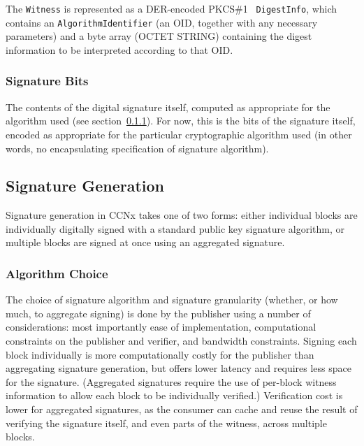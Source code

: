 The {\tt Witness} is represented as a DER-encoded PKCS\#1 {\tt
  DigestInfo}, which contains an {\tt AlgorithmIdentifier} (an OID,
together with any necessary parameters) and a byte array (OCTET
STRING) containing the digest information to be interpreted according
to that OID.


\subsubsection{Signature Bits}

The contents of the digital signature itself, computed as appropriate
for the algorithm used (see
section~\ref{sec:SignatureAlgorithmChoice}). For now, this is the bits
of the signature itself, encoded as appropriate for the particular
cryptographic algorithm used (in other words, no encapsulating
specification of signature algorithm).


\subsection{Signature Generation}

Signature generation in CCNx takes one of two forms: either individual
blocks are individually digitally signed with a standard public key
signature algorithm, or multiple blocks are signed at once using an
aggregated signature.


\subsubsection{Algorithm Choice}
\label{sec:SignatureAlgorithmChoice}

The choice of signature algorithm and signature granularity (whether,
or how much, to aggregate signing) is done by the publisher using a
number of considerations: most importantly ease of implementation,
computational constraints on the publisher and verifier, and bandwidth
constraints. Signing each block individually is more computationally
costly for the publisher than aggregating signature generation, but
offers lower latency and requires less space for the
signature. (Aggregated signatures require the use of per-block witness
information to allow each block to be individually verified.)
Verification cost is lower for aggregated signatures, as the consumer
can cache and reuse the result of verifying the signature itself, and
even parts of the witness, across multiple blocks.

